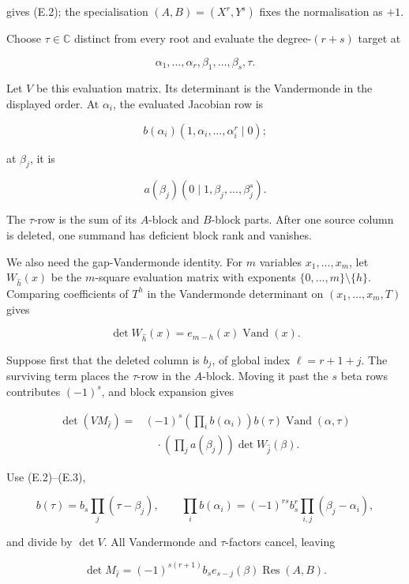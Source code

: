\documentclass[
  11pt,
  a4paper,
]{article}
\begin{document}
gives (E.2); the specialisation \((A,B)=(X^r,Y^s)\) fixes the
normalisation as \(+1\).

Choose \(\tau\in\mathbb C\) distinct from every root and evaluate the
degree-\((r+s)\) target at

\[
 \alpha_1,\ldots,\alpha_r,\beta_1,\ldots,\beta_s,\tau.
\]

Let \(V\) be this evaluation matrix. Its determinant is the Vandermonde
in the displayed order. At \(\alpha_i\), the evaluated Jacobian row is

\[
 b(\alpha_i)(1,\alpha_i,\ldots,\alpha_i^r\mid0);
\]

at \(\beta_j\), it is

\[
 a(\beta_j)(0\mid1,\beta_j,\ldots,\beta_j^s).
\]

The \(\tau\)-row is the sum of its \(A\)-block and \(B\)-block parts.
After one source column is deleted, one summand has deficient block rank
and vanishes.

We also need the gap-Vandermonde identity. For \(m\) variables
\(x_1,\ldots,x_m\), let \(W_{\widehat h}(x)\) be the \(m\)-square
evaluation matrix with exponents \(\{0,\ldots,m\}\setminus\{h\}\).
Comparing coefficients of \(T^h\) in the Vandermonde determinant on
\((x_1,\ldots,x_m,T)\) gives

\[
 \det W_{\widehat h}(x)
 =e_{m-h}(x)\operatorname{Vand}(x).
\tag{E.3}
\]

Suppose first that the deleted column is \(b_j\), of global index
\(\ell=r+1+j\). The surviving term places the \(\tau\)-row in the
\(A\)-block. Moving it past the \(s\) beta rows contributes \((-1)^s\),
and block expansion gives

\[
 \begin{aligned}
 \det(VM_{\widehat\ell})
 ={}&(-1)^s
 \left(\prod_i b(\alpha_i)\right)b(\tau)
 \operatorname{Vand}(\alpha,\tau)\\
 &\quad\cdot
 \left(\prod_j a(\beta_j)\right)
 \det W_{\widehat j}(\beta).
 \end{aligned}
\tag{E.4}
\]

Use (E.2)--(E.3),

\[
 b(\tau)=b_s\prod_j(\tau-\beta_j),\qquad
 \prod_i b(\alpha_i)=(-1)^{rs}b_s^r
       \prod_{i,j}(\beta_j-\alpha_i),
\]

and divide by \(\det V\). All Vandermonde and \(\tau\)-factors cancel,
leaving

\[
 \det M_{\widehat\ell}
 =(-1)^{s(r+1)}b_se_{s-j}(\beta)\operatorname{Res}(A,B).
\tag{E.5}
\]
\end{document}
